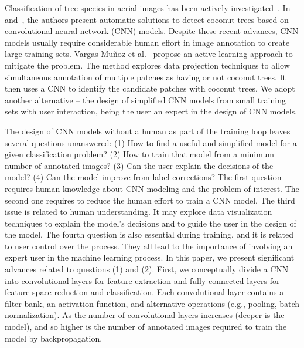 \documentclass[a4paper,conference]{IEEEtran}
\begin{document}
Classification of tree species in aerial images has been actively investigated~\cite{fassnacht2016review}. In \cite{puttemans2018comparing} and~\cite{aparna2018cnn}, the authors present automatic solutions to detect coconut trees based on convolutional neural network (CNN) models. Despite these recent advances, CNN models usually require considerable human effort in image annotation to create large training sets. Vargas-Muñoz et al.~\cite{8899005} propose an active learning approach to mitigate the problem. The method explores data projection techniques to allow simultaneous annotation of multiple patches as having or not coconut trees. It then uses a CNN to identify the candidate patches with coconut trees. We adopt another alternative -- the design of simplified CNN models from small training sets with user interaction, being the user an expert in the design of CNN models. 


The design of CNN models without a human as part of the training loop leaves several questions unanswered: (1) How to find a useful and simplified model for a given classification problem? (2) How to train that model from a minimum number of annotated images?  (3) Can the user explain the decisions of the model? (4) Can the model improve from label corrections? The first question requires human knowledge about CNN modeling and the problem of interest. The second one requires to reduce the human effort to train a CNN model. The third issue is related to human understanding. It may explore data visualization techniques to explain the model's decisions and to guide the user in the design of the model. The fourth question is also essential during training, and it is related to user control over the process. They all lead to the importance of involving an expert user in the machine learning process.
In this paper, we present significant advances related to questions (1) and (2). First, we conceptually divide a CNN into convolutional layers for feature extraction and fully connected layers for feature space reduction and classification. Each convolutional layer contains a filter bank, an activation function, and alternative operations (e.g., pooling, batch normalization).  As the number of convolutional layers increases (deeper is the model), and so higher is the number of annotated images required to train the model by backpropagation. 
\end{document}

